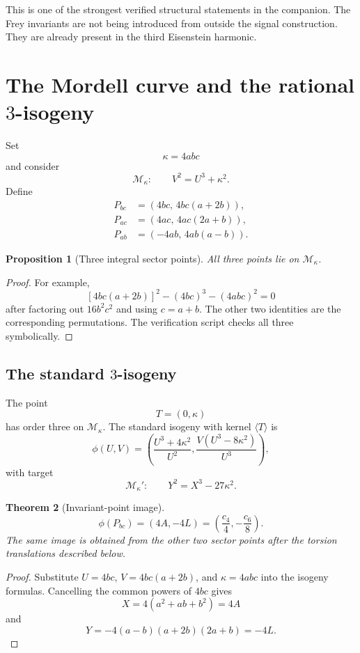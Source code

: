 \documentclass[11pt]{article}
\newtheorem{theorem}{Theorem}[section]
\newtheorem{proposition}[theorem]{Proposition}
\newcommand{\calM}{\mathcal M}
\begin{document}
This is one of the strongest verified structural statements in the companion.  The Frey invariants are not being introduced from outside the signal construction.  They are already present in the third Eisenstein harmonic.

\section{The Mordell curve and the rational \texorpdfstring{$3$}{3}-isogeny}

Set
\[
  \kappa=4abc
\]
and consider
\[
  \calM_\kappa:\qquad V^2=U^3+\kappa^2.
\]
Define
\[
\begin{aligned}
P_{bc}&=(4bc,\,4bc(a+2b)),\\
P_{ac}&=(4ac,\,4ac(2a+b)),\\
P_{ab}&=(-4ab,\,4ab(a-b)).
\end{aligned}
\]

\begin{proposition}[Three integral sector points]
All three points lie on $\calM_\kappa$.
\end{proposition}

\begin{proof}
For example,
\[
  [4bc(a+2b)]^2-(4bc)^3-(4abc)^2=0
\]
after factoring out $16b^2c^2$ and using $c=a+b$.  The other two identities are the corresponding permutations.  The verification script checks all three symbolically.
\end{proof}

\subsection{The standard \texorpdfstring{$3$}{3}-isogeny}

The point
\[
  T=(0,\kappa)
\]
has order three on $\calM_\kappa$.  The standard isogeny with kernel $\langle T\rangle$ is
\[
  \phi(U,V)=
  \left(
    \frac{U^3+4\kappa^2}{U^2},
    \frac{V(U^3-8\kappa^2)}{U^3}
  \right),
\]
with target
\[
  \calM_\kappa':\qquad Y^2=X^3-27\kappa^2.
\]

\begin{theorem}[Invariant-point image]
\[
  \boxed{\phi(P_{bc})=(4A,-4L)
  =\left(\frac{c_4}{4},-\frac{c_6}{8}\right).}
\]
The same image is obtained from the other two sector points after the torsion translations described below.
\end{theorem}

\begin{proof}
Substitute $U=4bc$, $V=4bc(a+2b)$, and $\kappa=4abc$ into the isogeny formulas.  Cancelling the common powers of $4bc$ gives
\[
  X=4(a^2+ab+b^2)=4A
\]
and
\[
  Y=-4(a-b)(a+2b)(2a+b)=-4L.
\]
\end{proof}
\end{document}
